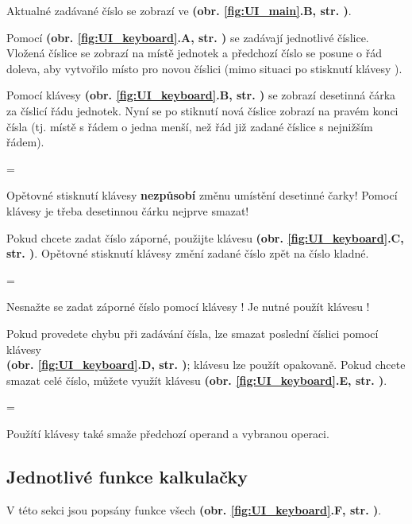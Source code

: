 \documentclass[a5paper,8pt,twoside]{extarticle}
\newenvironment{warningBox}
  {\par\begin{mdframed}[linewidth=1pt,linecolor=black]%
    \begin{list}{}{\leftmargin=1cm
                   \labelwidth=\leftmargin}\item[\Large\warning]}
  {\end{list}\end{mdframed}\par}
\newenvironment{prohibitBox}
  {\par\begin{mdframed}[linewidth=1pt,linecolor=black]%
    \begin{list}{}{\leftmargin=1cm
                   \labelwidth=\leftmargin}\item[\Large\noway]}
  {\end{list}\end{mdframed}\par}
\newcommand*\fref[2]{\textbf{(obr. \ref{#1}#2, str. \pageref{#1})}}
\begin{document}
    Aktualné zadávané číslo se zobrazí ve  \fref{fig:UI_main}{.B}.

    Pomocí  \fref{fig:UI_keyboard}{.A} se zadávají jednotlivé číslice. Vložená číslice se zobrazí na místě jednotek a předchozí číslo se posune o řád doleva, aby vytvořilo místo pro novou číslici (mimo situaci po stisknutí klávesy ).

    Pomocí klávesy  \fref{fig:UI_keyboard}{.B} se zobrazí desetinná čárka za číslicí řádu jednotek. Nyní se po stiknutí  nová číslice zobrazí na pravém konci čísla (tj. místě s řádem o jedna menší, než řád již zadané číslice s nejnižším řádem).

    \begin{prohibitBox}
        Opětovné stisknutí klávesy  \textbf{nezpůsobí} změnu umístění desetinné čarky! Pomocí klávesy  je třeba desetinnou čá\-rku nejprve smazat!
    \end{prohibitBox}

    Pokud chcete zadat číslo záporné, použijte klávesu  \fref{fig:UI_keyboard}{.C}. Opětovné stisknutí klávesy změní zadané číslo zpět na číslo kladné.

    \begin{prohibitBox}
        Nesnažte se zadat záporné číslo pomocí klávesy ! Je nutné použít klávesu !
    \end{prohibitBox}

    Pokud provedete chybu při zadávání čísla, lze smazat poslední číslici pomocí klávesy \\ \fref{fig:UI_keyboard}{.D}; klávesu lze použít opakovaně. Pokud chcete smazat celé číslo, můžete využít klávesu  \fref{fig:UI_keyboard}{.E}.

    \begin{warningBox}
        Použítí klávesy  také smaže předchozí operand a vybranou operaci.
    \end{warningBox}

    \renewcommand\thesubsubsection{\thesubsection.\arabic{subsubsection}}
    \subsection{Jednotlivé funkce kalkulačky}
    \label{sec:function_reference}
    V této sekci jsou popsány funkce všech  \fref{fig:UI_keyboard}{.F}.
\end{document}
